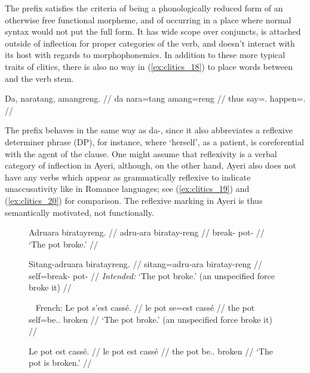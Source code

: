 The  prefix satisfies the criteria of being a
phonologically reduced form of an otherwise free functional morpheme, and of
occurring in a place where normal syntax would not put the full form. It has
wide scope over conjuncts, is attached outside of inflection for
proper categories of the verb, and doesn't interact with its host with regards
to morphophonemics. In addition to these more typical traits of clitics, there
is also no way in (\ref{ex:clitics_18}) to place words between 
and the verb stem.

\ex\label{ex:clitics_18}\begingl
	\gla Da, naratang, amangreng. //
	\glb da nara=tang amang=reng //
	\glc thus say=\TplM{}.\Aarg{} happen=\TsgI{}.\Aarg{} //
\endgl\xe

\label{clitics_preverb_refl}
The prefix  behaves in the same way as 
{da-}, since it also abbreviates a reflexive determiner phrase (DP), for instance,
 where `herself', as a patient, is
coreferential with the agent of the clause. One might assume that reflexivity
is a verbal category of inflection in Ayeri, although, on the other hand, Ayeri
also does not have any verbs which appear as grammatically reflexive to
indicate unaccusativity like in Romance languages; see (\ref{ex:clitics_19}) and
(\ref{ex:clitics_20}) for comparison. The reflexive marking in
Ayeri is thus semantically motivated, not functionally.

\begin{figure}
\pex\label{ex:clitics_19}
\a\label{ex:clitics_19a}\begingl
	\gla Adruara biratayreng. //
	\glb adru-ara biratay-reng //
	\glc break-\TsgI{} pot-\AargI{} //
	\glft `The pot broke.' //
\endgl

\a\label{ex:clitics_19b}\ljudge{*}\begingl
	\gla Sitang-adruara biratayreng. //
	\glb sitang=adru-ara biratay-reng //
	\glc self=break-\TsgI{} pot-\AargI{} //
	\glft \textit{Intended:} `The pot broke.' (an unspecified force broke 
		it) //
\endgl
\xe
\end{figure}

\begin{figure}
\pex~\label{ex:clitics_20}%
French:
\a\label{ex:clitics_20a}\begingl
	\gla Le pot s'est cassé. //
	\glb le pot se=est cassé //
	\glc the pot self=be.\Tsg{}.\Prs{} broken //
	\glft `The pot broke.' (an unspecified force broke it) //
\endgl

\a\label{ex:clitics_20b}\begingl
	\gla Le pot est cassé. //
	\glb le pot est cassé //
	\glc the pot be.\Tsg{}.\Prs{} broken //
	\glft `The pot is broken.' //
\endgl
\xe
\end{figure}

